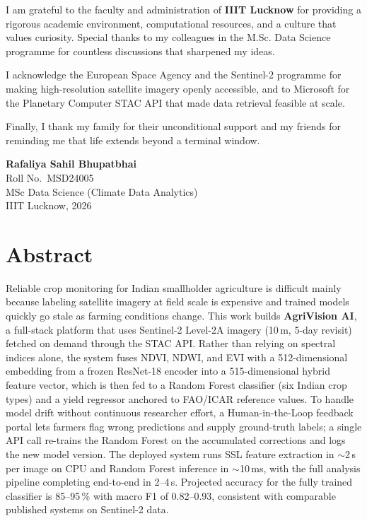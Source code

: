 \documentclass[12pt,a4paper,oneside]{report}
\begin{document}
I am grateful to the faculty and administration of \textbf{IIIT Lucknow} for
providing a rigorous academic environment, computational resources, and a culture
that values curiosity. Special thanks to my colleagues in the M.Sc. Data Science
programme for countless discussions that sharpened my ideas.

I acknowledge the European Space Agency and the Sentinel-2 programme for making
high-resolution satellite imagery openly accessible, and to Microsoft for the
Planetary Computer STAC API that made data retrieval feasible at scale.

Finally, I thank my family for their unconditional support and my friends for
reminding me that life extends beyond a terminal window.

\vspace{1.5cm}
\noindent\textbf{Rafaliya Sahil Bhupatbhai}\\
Roll No.~MSD24005\\
MSc Data Science (Climate Data Analytics)\\
IIIT Lucknow, 2026
\clearpage

\chapter*{Abstract}

Reliable crop monitoring for Indian smallholder agriculture is difficult mainly
because labeling satellite imagery at field scale is expensive and trained models
quickly go stale as farming conditions change. This work builds \textbf{AgriVision AI},
a full-stack platform that uses Sentinel-2 Level-2A imagery (10\,m, 5-day revisit)
fetched on demand through the STAC API. Rather than relying on spectral indices
alone, the system fuses NDVI, NDWI, and EVI with a 512-dimensional embedding from
a frozen ResNet-18 encoder into a 515-dimensional hybrid feature vector, which is
then fed to a Random Forest classifier (six Indian crop types) and a yield regressor
anchored to FAO/ICAR reference values. To handle model drift without continuous
researcher effort, a Human-in-the-Loop feedback portal lets farmers flag wrong
predictions and supply ground-truth labels; a single API call re-trains the
Random Forest on the accumulated corrections and logs the new model version. The
deployed system runs SSL feature extraction in $\sim$2\,s per image on CPU and
Random Forest inference in $\sim$10\,ms, with the full analysis pipeline completing
end-to-end in 2--4\,s. Projected accuracy for the fully trained classifier is
85--95\,\% with macro F1 of 0.82--0.93, consistent with comparable published systems
on Sentinel-2 data.
\end{document}
